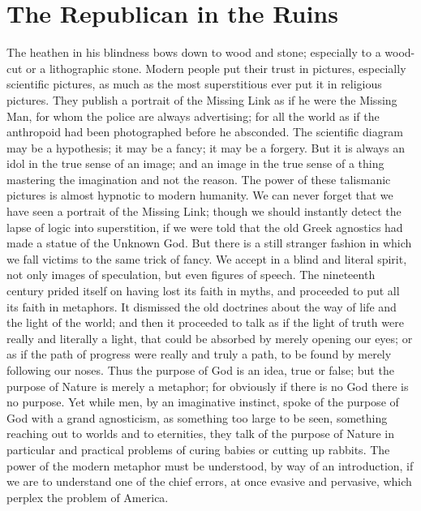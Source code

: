 \documentclass{book}
\begin{document}
\chapter{The Republican in the Ruins}
\label{chapter-11}
The heathen in his blindness bows down to wood and stone; especially to a wood-cut or a lithographic stone. Modern people put their trust in pictures, especially scientific pictures, as much as the most superstitious ever put it in religious pictures. They publish a portrait of the Missing Link as if he were the Missing Man, for whom the police are always advertising; for all the world as if the anthropoid had been photographed before he absconded. The scientific diagram may be a hypothesis; it may be a fancy; it may be a forgery. But it is always an idol in the true sense of an image; and an image in the true sense of a thing mastering the imagination and not the reason. The power of these talismanic pictures is almost hypnotic to modern humanity. We can never forget that we have seen a portrait of the Missing Link; though we should instantly detect the lapse of logic into superstition, if we were told that the old Greek agnostics had made a statue of the Unknown God. But there is a still stranger fashion in which we fall victims to the same trick of fancy. We accept in a blind and literal spirit, not only images of speculation, but even figures of speech. The nineteenth century prided itself on having lost its faith in myths, and proceeded to put all its faith in metaphors. It dismissed the old doctrines about the way of life and the light of the world; and then it proceeded to talk as if the light of truth were really and literally a light, that could be absorbed by merely opening our eyes; or as if the path of progress were really and truly a path, to be found by merely following our noses. Thus the purpose of God is an idea, true or false; but the purpose of Nature is merely a metaphor; for obviously if there is no God there is no purpose. Yet while men, by an imaginative instinct, spoke of the purpose of God with a grand agnosticism, as something too large to be seen, something reaching out to worlds and to eternities, they talk of the purpose of Nature in particular and practical problems of curing babies or cutting up rabbits. The power of the modern metaphor must be understood, by way of an introduction, if we are to understand one of the chief errors, at once evasive and pervasive, which perplex the problem of America.
\end{document}
